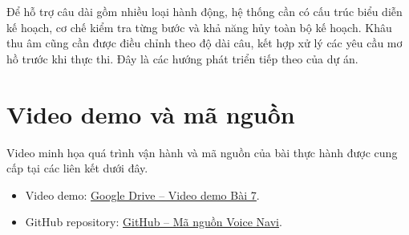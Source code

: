 \documentclass[13pt,a4paper]{extarticle}
\begin{document}
Để hỗ trợ câu dài gồm nhiều loại hành động, hệ thống cần có cấu trúc biểu diễn kế hoạch, cơ chế kiểm tra từng bước và khả năng hủy toàn bộ kế hoạch. Khâu thu âm cũng cần được điều chỉnh theo độ dài câu, kết hợp xử lý các yêu cầu mơ hồ trước khi thực thi. Đây là các hướng phát triển tiếp theo của dự án.

\section{Video demo và mã nguồn}

Video minh họa quá trình vận hành và mã nguồn của bài thực hành được cung cấp tại các liên kết dưới đây.

\begin{itemize}
  \item Video demo: \href{https://drive.google.com/drive/u/0/folders/1khVZZDVxWRnYRrrD_zvH0FuS1wvLYElE}{\underline{Google Drive -- Video demo Bài 7}}.
  \item GitHub repository: \href{https://github.com/vanthudat/Voice_Navi}{\underline{GitHub -- Mã nguồn Voice Navi}}.
\end{itemize}
\end{document}
